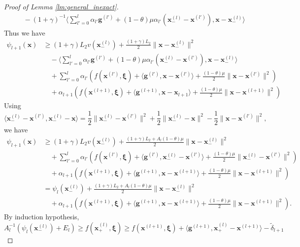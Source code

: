 \documentclass[10pt,a4paper]{amsart}
\newcommand{\bx}{\boldsymbol{\xi}}
\newcommand{\mb}{\mathbf}
\begin{document}
\begin{proof}[Proof of Lemma \ref{lm:general_inexact}]
\begin{align*}
    &\quad - (1+\gamma)^{-1}\langle \sum_{l'=0}^{l}\alpha_{l'}\mb g^{(l')}+(1-\theta)\mu\alpha_{l'}(\mb x_-^{(l)} - \mb x^{(l')}),\mb x-\mb x_-^{(l)}\rangle
\end{align*}
Thus we have
\begin{align*}
    \psi_{l+1}(\mb x) &\geq (1+\gamma)L_2 v(\mb x_-^{(l)}) + \frac{(1+\gamma)L_2}{2}\|\mb x-\mb x_-^{(l)}\|^2 \\
    &\quad - \langle \sum_{l'=0}^{l}\alpha_{l'}\mb g^{(l')}+(1-\theta)\mu\alpha_{l'}(\mb x_-^{(l)} - \mb x^{(l')}),\mb x-\mb x_-^{(l)}\rangle \\
    &\quad+ \sum_{l'=0}^{l}\alpha_{l'}(f(\mb x^{(l')},\bx) + \langle \mb g^{(l')},\mb x- \mb x^{(l')}\rangle+\frac{(1-\theta)\mu}{2} \|\mb x- \mb x^{(l')}\|^2)\\
    &\quad + \alpha_{l+1}(f(\mb x^{(l+1)},\bx) +\langle \mb g^{(l+1)},\mb x-\mb x_{l+1}\rangle + \frac{(1-\theta)\mu}{2}\|\mb x - \mb x^{(l+1)}\|^2)
\end{align*}
Using 
\begin{displaymath}
    \langle \mb x_-^{(l)} - \mb x^{(l')} , \mb x_-^{(l)} - \mb x\rangle  = \frac{1}{2}\|\mb x_-^{(l)} - \mb x^{(l')}\|^2 + \frac{1}{2}\|\mb x_-^{(l)} - \mb x\|^2 - \frac{1}{2}\|\mb x - \mb x^{(l')}\|^2,
\end{displaymath}
we have
\begin{align*}
    \psi_{l+1}(\mb x) &\geq (1+\gamma)L_2 v(\mb x_-^{(l)}) +  \frac{(1+\gamma)L_2+A_l(1-\theta)\mu}{2}\|\mb x-\mb x_-^{(l)}\|^2 \\
    &\quad+\sum_{l'=0}^{l}\alpha_{l'}(f(\mb x^{(l')},\bx) + \langle \mb g^{(l')},\mb x_-^{(l)}- \mb x^{(l')}\rangle+\frac{(1-\theta)\mu}{2} \|\mb x_-^{(l)}- \mb x^{(l')}\|^2)\\
    &\quad + \alpha_{l+1}(f(\mb x^{(l+1)},\bx) +\langle \mb g^{(l+1)},\mb x-\mb x^{(l+1)}\rangle + \frac{(1-\theta)\mu}{2}\|\mb x - \mb x^{(l+1)}\|^2)\\
    & = \psi_l(\mb x_-^{(l)}) + \frac{(1+\gamma)L_2+A_l(1-\theta)\mu}{2}\|\mb x-\mb x_-^{(l)}\|^2\nonumber\\
    &\quad +\alpha_{l+1}(f(\mb x^{(l+1)},\bx) +\langle \mb g^{(l+1)},\mb x-\mb x^{(l+1)}\rangle + \frac{(1-\theta)\mu}{2}\|\mb x - \mb x^{(l+1)}\|^2).
\end{align*}
By induction hypothesis, 
\begin{displaymath}
    A_l^{-1}(\psi_l(\mb x_-^{(l)}) +E_l) \geq f(\mb x_+^{(l)},\bx) \geq f(\mb x^{(l+1)},\bx) + \langle \mb g^{(l+1)},\mb x_+^{(l)}-\mb x^{(l+1)}\rangle  - \tilde{\delta}_{l+1}

\end{displaymath}
\end{proof}
\end{document}
